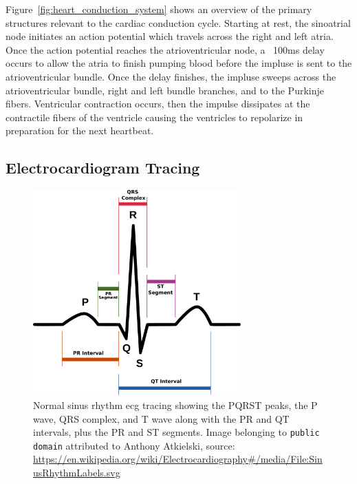 \documentclass[\main/thesis.tex]{subfiles}
\begin{document}
Figure~\ref{fig:heart_conduction_system} shows an overview of the primary structures relevant to the cardiac conduction cycle.
Starting at rest, the sinoatrial node initiates an action potential which travels across the right and left atria.
Once the action potential reaches the atrioventricular node, a ~100ms delay occurs to allow the atria to finish pumping blood before the impluse is sent to the atrioventricular bundle.
Once the delay finishes, the impluse sweeps across the atrioventricular bundle, right and left bundle branches, and to the Purkinje fibers.
Ventricular contraction occurs, then the impulse dissipates at the contractile fibers of the ventricle causing the ventricles to repolarize in preparation for the next heartbeat.

\subsection{Electrocardiogram Tracing}

\begin{figure}[ht]
    \centering
    \includegraphics[width=8cm]{figure/PQRST_NormalSinusRhythm.pdf}
    \caption[Normal sinus rhythm \gls{ecg} tracing with PQRST peaks annotated.]{Normal sinus rhythm \gls{ecg} tracing showing the PQRST peaks, the P wave, QRS complex, and T wave along with the PR and QT intervals, plus the PR and ST segments.
    Image belonging to \texttt{public domain} attributed to Anthony Atkielski, source: \url{https://en.wikipedia.org/wiki/Electrocardiography\#/media/File:SinusRhythmLabels.svg}
    }
    \label{fig:pqrst_nsr}
\end{figure}
\end{document}
